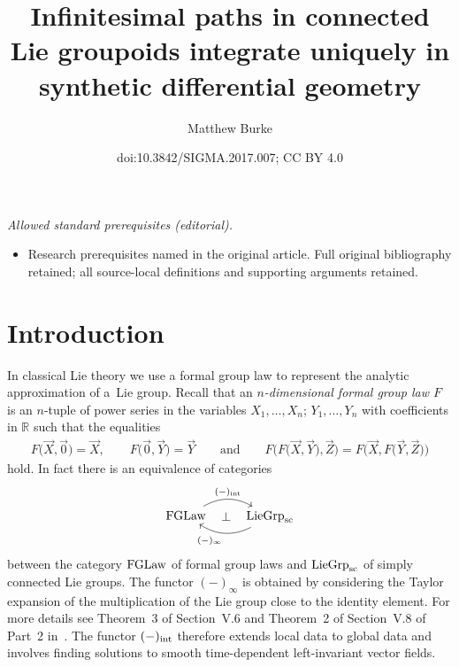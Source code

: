 \documentclass[10pt,a4paper]{amsart}
\title{Infinitesimal paths in connected Lie groupoids integrate uniquely in synthetic differential geometry}
\author{Matthew Burke}
\date{doi:10.3842/SIGMA.2017.007; CC BY 4.0}
\numberwithin{equation}{section}
\begin{document}
\maketitle
\noindent\textit{Allowed standard prerequisites (editorial).}\begin{itemize}
\item Research prerequisites named in the original article. Full original bibliography retained; all source-local definitions and supporting arguments retained.
\end{itemize}\medskip
\section{Introduction}

In classical Lie theory we use a formal group law to represent the analytic approximation of a~Lie group. Recall that an \emph{$n$-dimensional formal group law $F$} is an $n$-tuple of power series in the variables $X_{1},\dots ,X_{n}$; $Y_{1},\dots ,Y_{n}$ with coef\/f\/icients in $\mathbb{R}$ such that the equalities
\begin{gather*}
F\big(\vec{X},\vec{0}\big)=\vec{X},\qquad F\big(\vec{0},\vec{Y}\big)=\vec{Y}\qquad \text{and} \qquad F\big(F\big(\vec{X},\vec{Y}\big),\vec{Z}\big)=F\big(\vec{X},F\big(\vec{Y},\vec{Z}\big)\big)
\end{gather*}
hold. In fact there is an equivalence of categories
\begin{equation}\label{classical-lie}
\begin{tikzcd}
 {\rm FGLaw} \rar[bend left]{(-)_{\rm int}} \rar[phantom]{\perp} & {{\rm LieGrp}_{\rm sc}} \lar[bend left]{(-)_{\infty}}
\end{tikzcd}
\end{equation}
between the category ${\rm FGLaw}$ of formal group laws and ${\rm LieGrp}_{\rm sc}$ of simply connected Lie groups. The functor $(-)_{\infty}$ is obtained by considering the Taylor expansion of the multiplication of the Lie group close to the identity element. For more details see Theorem~3 of Section~V.6 and Theorem~2 of Section~V.8 of Part~2 in~\cite{MR2179691}. The functor $(-)_{\rm int}$ therefore extends local data to global data and involves f\/inding solutions to smooth time-dependent left-invariant vector f\/ields.
\end{document}
